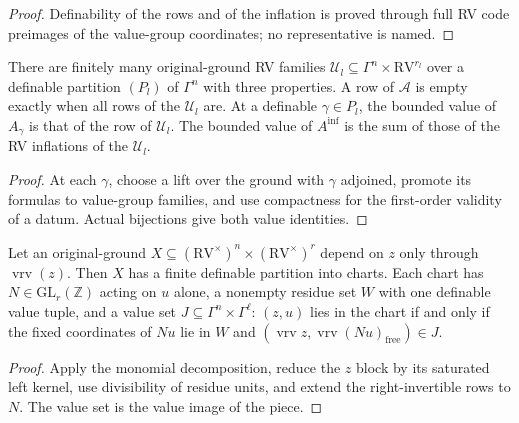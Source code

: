 \begin{proof}
Definability of the rows and of the inflation is proved through full RV code preimages of the value-group coordinates; no representative is named.
\end{proof}

\begin{lemma}
\label{uniform-reps}
\leanok
{}
There are finitely many original-ground RV families $\mathcal U_l\subseteq\Gamma^n\times\mathrm{RV}^{r_l}$ over a definable partition $(P_l)$ of $\Gamma^n$ with three properties. A row of $\mathcal A$ is empty exactly when all rows of the $\mathcal U_l$ are. At a definable $\gamma\in P_l$, the bounded value of $A_\gamma$ is that of the row of $\mathcal U_l$. The bounded value of $A^{\mathrm{inf}}$ is the sum of those of the RV inflations of the $\mathcal U_l$.
\end{lemma}

\begin{proof}
At each $\gamma$, choose a lift over the ground with $\gamma$ adjoined, promote its formulas to value-group families, and use compactness for the first-order validity of a datum. Actual bijections give both value identities.
\end{proof}

\begin{lemma}
\label{relative-chart}
\leanok
{}
Let an original-ground $X\subseteq(\mathrm{RV}^\times)^n\times(\mathrm{RV}^\times)^r$ depend on $z$ only through $\operatorname{vrv}(z)$. Then $X$ has a finite definable partition into charts. Each chart has $N\in\mathrm{GL}_r(\mathbb Z)$ acting on $u$ alone, a nonempty residue set $W$ with one definable value tuple, and a value set $J\subseteq\Gamma^n\times\Gamma^\ell$: $(z,u)$ lies in the chart if and only if the fixed coordinates of $Nu$ lie in $W$ and $(\operatorname{vrv}z,\operatorname{vrv}(Nu)_{\mathrm{free}})\in J$.
\end{lemma}

\begin{proof}
Apply the monomial decomposition, reduce the $z$ block by its saturated left kernel, use divisibility of residue units, and extend the right-invertible rows to $N$. The value set is the value image of the piece.
\end{proof}

